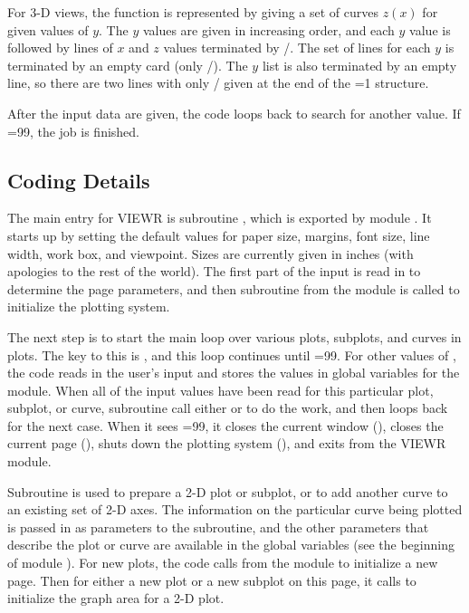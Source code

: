 For 3-D views, the function is represented by giving a set of curves
$z(x)$ for given values of $y$.  The $y$ values are given in
increasing order, and each $y$ value is followed by lines of
$x$ and $z$ values terminated by /.  The set of lines for each $y$ is
terminated by an empty card (only /).  The $y$ list is also terminated
by an empty line, so there are two lines with only / given at the end
of the =1 structure.

After the input data are given, the code loops back to search for
another  value.  If =99, the job is finished.


\subsection{Coding Details}
\label{ssVIEWR_details}

The main entry for VIEWR is subroutine
, which is
exported by module .
It starts up by setting the default values for paper size, margins,
font size, line width, work box, and viewpoint.  Sizes are currently
given in inches (with apologies to the rest of the world).  The first
part of the input is read in to determine the page parameters, and then
subroutine  from the 
module
is called to initialize the plotting system.

The next step is to start the main loop over various plots, subplots,
and curves in plots.  The key to this is , and this
loop continues until =99.  For other values of
, the code reads in the user's input and stores the
values in global variables for the  module.  When all
of the input values have been read for this particular plot, subplot,
or curve, subroutine  call either
 or
to do the work, and then loops back for the next case.
When it sees =99, it closes the current window
(), closes the current page
(), shuts down the
plotting system (),
and exits from the VIEWR module.

Subroutine  is used to prepare a 2-D plot or subplot,
or to add another curve to an existing set of 2-D axes.  The information
on the particular curve being plotted is passed in as parameters to the
subroutine, and the other parameters that describe the plot or curve
are available in the global variables (see the beginning of module
).  For new plots, the code calls
 from the
module to initialize a new page.  Then for either
a new plot or a new subplot on this page, it calls
to initialize the graph area for a 2-D plot.

